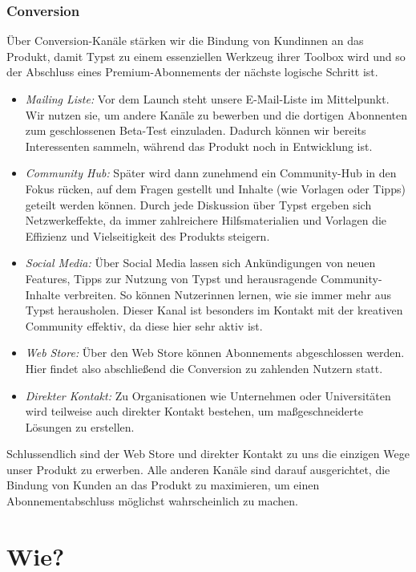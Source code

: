 \documentclass[11pt, a4paper]{article}
\newcommand{\gender}{\raisebox{-.25em}{*}}
\let\oldsection\section
\renewcommand\section{\clearpage\oldsection}
\renewcommand{\glossary} {\marginsymbol{\textbf{↪}}}
\newcommand{\marginsymbol}[1] {\protect\marginsymbolhelper{#1}}
\newcommand{\marginsymbolhelper}[1] {\tabto*{-1cm}\makebox[0cm]{#1}\tabto*{\TabPrevPos}}
\begin{document}
\subsubsection*{Conversion}


Über \glossary Conversion-Kanäle stärken wir die Bindung von Kund\gender{}innen an das Produkt, damit Typst zu einem essenziellen Werkzeug ihrer Toolbox wird und so der Abschluss eines Premium-Abonnements der nächste logische Schritt ist. 

\begin{itemize}
    \item \emph{Mailing Liste:}  Vor dem Launch steht unsere E-Mail-Liste im Mittelpunkt. Wir nutzen sie, um andere Kanäle zu bewerben und die dortigen Abonnenten zum geschlossenen Beta-Test einzuladen. Dadurch können wir bereits Interessenten sammeln, während das Produkt noch in Entwicklung ist.
    \item \emph{Community Hub:} Später wird dann zunehmend ein Community-Hub in den Fokus rücken, auf dem Fragen gestellt und Inhalte (wie Vorlagen oder Tipps) geteilt werden können. Durch jede Diskussion über Typst ergeben sich Netzwerkeffekte, da immer zahlreichere Hilfsmaterialien und Vorlagen die Effizienz und Vielseitigkeit des Produkts steigern.
    \item \emph{Social Media:} Über Social Media lassen sich Ankündigungen von neuen Features, Tipps zur Nutzung von Typst und herausragende Community-Inhalte verbreiten. So können Nutzer\gender{}innen lernen, wie sie immer mehr aus Typst herausholen. Dieser Kanal ist besonders im Kontakt mit der kreativen Community effektiv, da diese hier sehr aktiv ist.
    \item \emph{Web Store:} Über den Web Store können Abonnements abgeschlossen werden. Hier findet also abschließend die Conversion zu zahlenden Nutzern statt.
    \item \emph{Direkter Kontakt:} Zu Organisationen wie Unternehmen oder Universitäten wird teilweise auch direkter Kontakt bestehen, um maßgeschneiderte Lösungen zu erstellen.
\end{itemize}


Schlussendlich sind der Web Store und direkter Kontakt zu uns die einzigen Wege unser Produkt zu erwerben. Alle anderen Kanäle sind darauf ausgerichtet, die Bindung von Kunden an das Produkt zu maximieren, um einen Abonnementabschluss möglichst wahrscheinlich zu machen.

\section*{Wie?}
\end{document}

